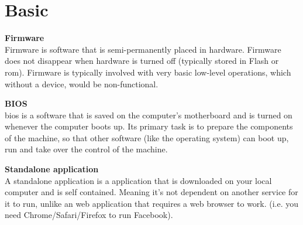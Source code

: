 \section{Basic}
\textbf{Firmware \\}
Firmware is software that is semi-permanently placed in hardware. Firmware does not disappear when 
hardware is turned off (typically stored in Flash or \acrshort{rom}). 
Firmware is typically involved with very basic low-level operations, which without a device, would be
non-functional.  

\textbf{BIOS} \\
\acrfull{bios} is a software that is saved on the computer's motherboard
and is turned on whenever the computer boots up. Its primary task is to prepare the components of the machine, so that other software (like the operating system) can boot up, run and take over the control of the machine.  

\textbf{Standalone application} \\
A standalone application is a application that is downloaded on your local computer and is self contained. Meaning it's not dependent on another service for it to run, unlike an web application that requires a web browser to work. (i.e. you need Chrome/Safari/Firefox to run Facebook). 

\newpage
    

